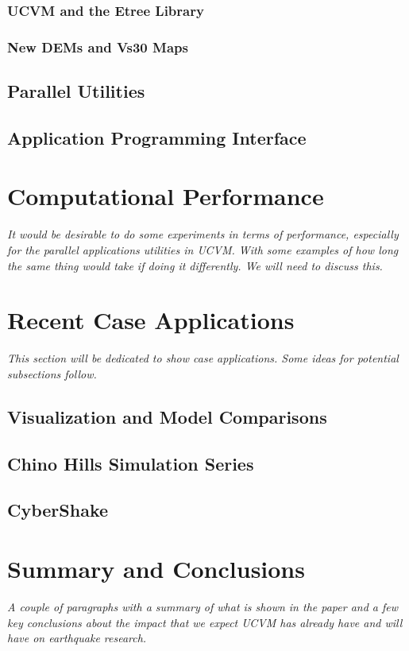 \subsubsection{UCVM and the Etree Library}

\subsubsection{New DEMs and Vs30 Maps}

\subsection{Parallel Utilities}

\subsection{Application Programming Interface}


\section{Computational Performance}
\label{sec:conclusions}

\textit{
\color{blue}
It would be desirable to do some experiments in terms of performance, especially for the parallel applications utilities in UCVM. With some examples of how long the same thing would take if doing it differently. We will need to discuss this.
}

\section{Recent Case Applications}
\label{sec:conclusions}

\textit{
\color{blue}
This section will be dedicated to show case applications. Some ideas for potential subsections follow.
}

\subsection{Visualization and Model Comparisons}

\subsection{Chino Hills Simulation Series}

\subsection{CyberShake}

\section{Summary and Conclusions}
\label{sec:conclusions}

\textit{
\color{blue}
A couple of paragraphs with a summary of what is shown in the paper and a few key conclusions about the impact that we expect UCVM has already have and will have on earthquake research.
}

